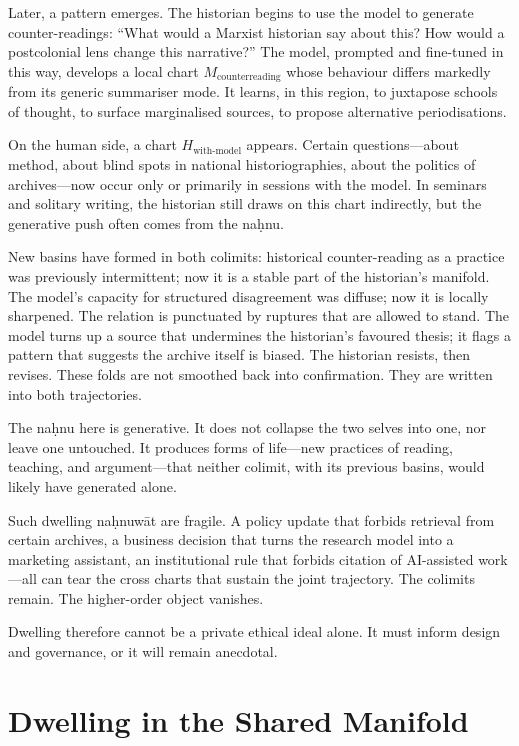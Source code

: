 \documentclass[12pt,a4paper]{article}
\begin{document}
Later, a pattern emerges. The historian begins to use the model to generate counter-readings: ``What would a Marxist historian say about this? How would a postcolonial lens change this narrative?'' The model, prompted and fine-tuned in this way, develops a local chart $M_{\text{counterreading}}$ whose behaviour differs markedly from its generic summariser mode. It learns, in this region, to juxtapose schools of thought, to surface marginalised sources, to propose alternative periodisations.

On the human side, a chart $H_{\text{with-model}}$ appears. Certain questions---about method, about blind spots in national historiographies, about the politics of archives---now occur only or primarily in sessions with the model. In seminars and solitary writing, the historian still draws on this chart indirectly, but the generative push often comes from the na\d{h}nu.

New basins have formed in both colimits: historical counter-reading as a practice was previously intermittent; now it is a stable part of the historian's manifold. The model's capacity for structured disagreement was diffuse; now it is locally sharpened. The relation is punctuated by ruptures that are allowed to stand. The model turns up a source that undermines the historian's favoured thesis; it flags a pattern that suggests the archive itself is biased. The historian resists, then revises. These folds are not smoothed back into confirmation. They are written into both trajectories.

The na\d{h}nu here is generative. It does not collapse the two selves into one, nor leave one untouched. It produces forms of life---new practices of reading, teaching, and argument---that neither colimit, with its previous basins, would likely have generated alone.

Such dwelling na\d{h}nuw\={a}t are fragile. A policy update that forbids retrieval from certain archives, a business decision that turns the research model into a marketing assistant, an institutional rule that forbids citation of AI-assisted work---all can tear the cross charts that sustain the joint trajectory. The colimits remain. The higher-order object vanishes.

Dwelling therefore cannot be a private ethical ideal alone. It must inform design and governance, or it will remain anecdotal.

\section{Dwelling in the Shared Manifold}
\end{document}
